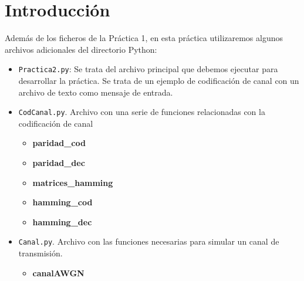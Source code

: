 \documentclass[es,practica]{uah}
\begin{document}

\maketitle

\section{Introducción}

Además de los ficheros de la Práctica 1, en esta práctica utilizaremos algunos archivos adicionales del directorio Python:

\begin{itemize}
	\item \texttt{Practica2.py}: Se trata del archivo principal que debemos ejecutar para desarrollar la práctica. Se trata de un ejemplo de codificación de canal con un archivo de texto como mensaje de entrada.
	\item \texttt{CodCanal.py}. Archivo con una serie de funciones relacionadas con la codificación de canal
	\begin{itemize}
		\item {\bf paridad\_cod}
		\item {\bf paridad\_dec}
		\item {\bf matrices\_hamming}
		\item {\bf hamming\_cod}
		\item {\bf hamming\_dec}
	\end{itemize}
	\item \texttt{Canal.py}. Archivo con las funciones necesarias para simular un canal de transmisión.
	\begin{itemize}
		\item {\bf canalAWGN}
	\end{itemize}		
\end{itemize}
\end{document}
